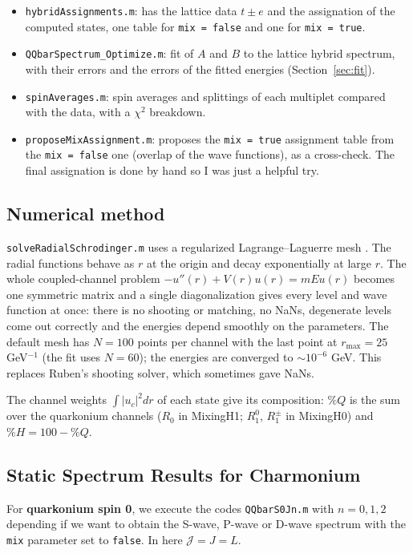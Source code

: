 \documentclass[11pt, a4paper]{article}
\begin{document}
\begin{itemize}
    \item \texttt{hybridAssignments.m}: has the lattice data $t\pm e$ and the assignation of the computed states, one table for \texttt{mix = false} and one for \texttt{mix = true}.
    \item \texttt{QQbarSpectrum\_Optimize.m}: fit of $A$ and $B$ to the lattice hybrid spectrum, with their errors and the errors of the fitted energies (Section~\ref{sec:fit}).
    \item \texttt{spinAverages.m}: spin averages and splittings of each multiplet compared with the data, with a $\chi^2$ breakdown.
    \item \texttt{proposeMixAssignment.m}: proposes the \texttt{mix = true} assignment table from the \texttt{mix = false} one (overlap of the wave functions), as a cross-check. {\color{red} The final assignation is done by hand so I was just a helpful try.}
\end{itemize}

\subsection{Numerical method}\label{sec:SolveSchro}
\texttt{solveRadialSchrodinger.m} uses a regularized Lagrange--Laguerre mesh \cite{BAYE20151}. The radial functions behave as $r$ at the origin and decay exponentially at large $r$. The whole coupled-channel problem $-u''(r)+V(r)u(r)=mEu(r)$ becomes one symmetric matrix and a single diagonalization gives every level and wave function at once: there is no shooting or matching, no NaNs, degenerate levels come out correctly and the energies depend smoothly on the parameters. The default mesh has $N=100$ points per channel with the last point at $r_{\max}=25$ GeV$^{-1}$ (the fit uses $N=60$); the energies are converged to $\sim10^{-6}$ GeV. This replaces Ruben's shooting solver, which sometimes gave NaNs.

The channel weights $\int |u_c|^2 dr$ of each state give its composition: $\%Q$ is the sum over the quarkonium channels ($R_0$ in MixingH1; $R_1^0$, $R_1^\pm$ in MixingH0) and $\%H = 100-\%Q$.

\subsection{Static Spectrum Results for Charmonium}
For \textbf{quarkonium spin 0}, we execute the codes \texttt{QQbarS0Jn.m} with $n=0,1,2$ depending if we want to obtain the S-wave, P-wave or D-wave spectrum with the \texttt{mix} parameter set to \texttt{false}. In here $\mathcal{J}=J=L$.
\end{document}
